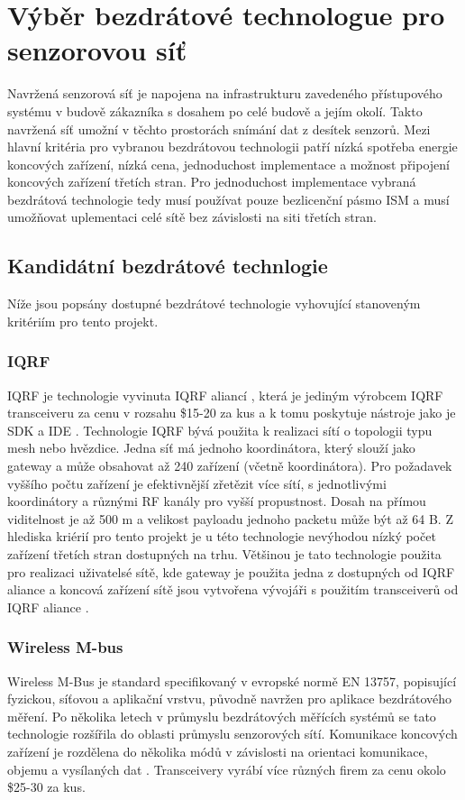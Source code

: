   \chapter{Výběr bezdrátové technologue pro senzorovou síť}
Navržená senzorová síť je napojena na infrastrukturu zavedeného přístupového systému v budově zákazníka s dosahem po celé budově a jejím okolí. Takto navržená síť umožní v těchto prostorách snímání dat z desítek senzorů.
Mezi hlavní kritéria pro vybranou bezdrátovou technologii patří nízká spotřeba energie koncových zařízení, nízká cena, jednoduchost implementace a možnost připojení koncových zařízení třetích stran.
Pro jednoduchost implementace vybraná bezdrátová technologie tedy musí používat pouze bezlicenční pásmo ISM a musí umožňovat uplementaci celé sítě bez závislosti na siti třetích stran. 

\section{Kandidátní bezdrátové technlogie}
Níže jsou popsány dostupné bezdrátové technologie vyhovující stanoveným kritériím pro tento projekt.

\subsection{IQRF}
IQRF je technologie vyvinuta IQRF aliancí \cite{iqrf_alliance}, která je jediným výrobcem IQRF transceiveru \cite{iqrf_transceivers} za cenu v rozsahu \$15-20 za kus a k tomu poskytuje nástroje jako je SDK \cite{iqrf_sdk} a IDE \cite{iqrf_ide}.
Technologie IQRF bývá použita k realizaci sítí o topologii typu mesh nebo hvězdice.
Jedna síť má jednoho koordinátora, který slouží jako gateway a může obsahovat až 240 zařízení (včetně koordinátora). Pro požadavek vyššího počtu zařízení je efektivnější zřetězit více sítí, s jednotlivými koordinátory a různými RF kanály pro vyšší propustnost.
Dosah na přímou viditelnost je až 500 m a velikost payloadu jednoho packetu může být až 64 B.
Z hlediska kriérií pro tento projekt je u této technologie nevýhodou nízký počet zařízení třetích stran dostupných na trhu. 
Většinou je tato technologie použita pro realizaci uživatelsé sítě, kde gateway je použita jedna z dostupných od IQRF aliance a koncová zařízení sítě jsou vytvořena vývojáři s použitím transceiverů od IQRF aliance
\cite{paper_iqrf}.


\subsection{Wireless M-bus}
Wireless M-Bus je standard specifikovaný v evropské normě EN 13757, popisující fyzickou, síťovou a aplikační vrstvu, původně navržen pro aplikace bezdrátového měření. 
Po několika letech v průmyslu bezdrátových měřících systémů se tato technologie rozšířila do oblasti průmyslu senzorových sítí.
Komunikace koncových zařízení je rozdělena do několika módů v závislosti na orientaci komunikace, objemu a vysílaných dat \cite{wirelessMBus01} \cite{wirelessMBus02}. Transceivery vyrábí více různých firem za cenu okolo \$25-30 za kus.


